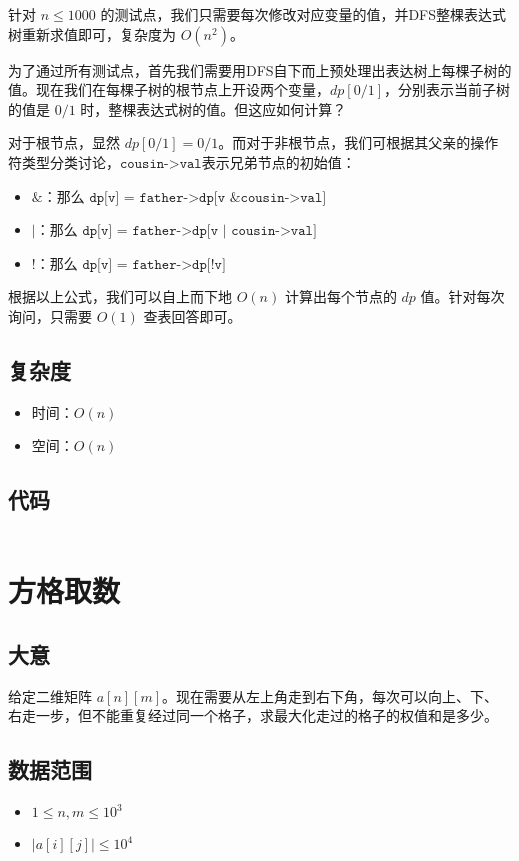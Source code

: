 \documentclass{article}
\begin{document}
针对 $n \le 1000$ 的测试点，我们只需要每次修改对应变量的值，并DFS整棵表达式树重新求值即可，复杂度为 $O(n^2)$。

为了通过所有测试点，首先我们需要用DFS自下而上预处理出表达树上每棵子树的值。现在我们在每棵子树的根节点上开设两个变量，$dp[0/1]$，分别表示当前子树的值是 $0/1$ 时，整棵表达式树的值。但这应如何计算？

对于根节点，显然 $dp[0/1] = 0/1$。而对于非根节点，我们可根据其父亲的操作符类型分类讨论，$\texttt{cousin->val}$表示兄弟节点的初始值：

\begin{itemize}
    \item $\&$：那么 $\texttt{dp[v] = father->dp[v \& cousin->val]}$
    \item $|$：那么 $\texttt{dp[v] = father->dp[v | cousin->val]}$
    \item $!$：那么 $\texttt{dp[v] = father->dp[!v]}$
\end{itemize}

根据以上公式，我们可以自上而下地 $O(n)$ 计算出每个节点的 $dp$ 值。针对每次询问，只需要 $O(1)$ 查表回答即可。

\subsection*{复杂度}
\begin{itemize}
\item 时间：$O(n)$
\item 空间：$O(n)$
\end{itemize}
\subsection*{代码}
\inputminted[linenos,autogobble]{cpp}{T3.cpp}

\section{方格取数}
\subsection*{大意}
给定二维矩阵 $a[n][m]$。现在需要从左上角走到右下角，每次可以向上、下、右走一步，但不能重复经过同一个格子，求最大化走过的格子的权值和是多少。
\subsection*{数据范围}
\begin{itemize}
\item $1\le n,m\le 10^3$
\item $|a[i][j]|\le 10^4$
\end{itemize}
\end{document}
